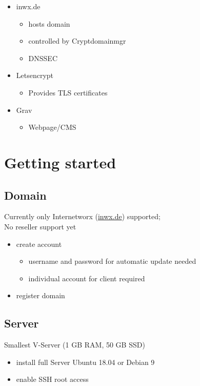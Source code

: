 \documentclass{beamer}
\begin{document}
	\begin{frame}{\insertsection}{\insertsubsection}
		\vspace{-0.5cm}
		
		\begin{itemize}
			\item inwx.de
			\begin{itemize}
				\item hosts domain
				\item controlled by Cryptdomainmgr
				\item DNSSEC
			\end{itemize}
			\item Letsencrypt
			\begin{itemize}
				\item Provides TLS certificates
			\end{itemize}
			\item Grav
			\begin{itemize}
				\item Webpage/CMS
			\end{itemize}
		\end{itemize}
	\end{frame}
	
\section{Getting started}
\subsection{Domain}
\begin{frame}{\insertsection}{\insertsubsection}
	\vspace{-0.5cm}
	Currently only Internetworx (\url{inwx.de}) supported;\\
	No reseller support yet 
	\begin{itemize}
		\item create account
		\begin{itemize}
			\item username and password for automatic update needed
			\item individual account for client required
		\end{itemize}
		\item register domain
	\end{itemize}
\end{frame}	

\subsection{Server}
\begin{frame}{\insertsection}{\insertsubsection}
	\vspace{-0.5cm}
	Smallest V-Server (1 GB RAM, 50 GB SSD)
	\begin{itemize}
		\item install full Server Ubuntu 18.04 or Debian 9
		\item enable SSH root access
	\end{itemize}
\end{frame}	
\end{document}
